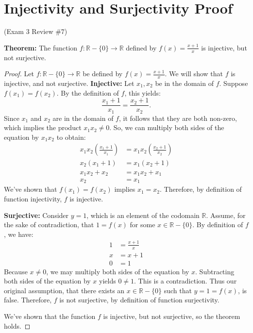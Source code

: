 \documentclass[12pt]{amsart}
\begin{document}
\section{Injectivity and Surjectivity Proof}
\begin{center}(Exam 3 Review $\#7$)\end{center}
\textbf{Theorem:} The function $f: \mathbb{R}-\{0\} \rightarrow \mathbb{R}$ defined by $f(x) = \frac{x+1}{x}$ is injective, but not surjective.
\begin{proof}
Let $f: \mathbb{R} - \{0\} \rightarrow \mathbb{R}$ be defined by $f(x)=\frac{x+1}{x}$. We will show that $f$ is injective, and not surjective.
\medskip
\newline
\textbf{Injective:} 
Let $x_1,x_2$ be in the domain of $f$. Suppose $f(x_1) = f(x_2)$. By the definition of $f$, this yields:
\[
    \frac{x_1+1}{x_1} = \frac{x_2+1}{x_2}.
\]
Since $x_1$ and $x_2$ are in the domain of $f$, it follows that they are both non-zero, which implies the product $x_1x_2 \ne 0$. So, we can multiply both sides of the equation by $x_1x_2$ to obtain:
\begin{align*}
    x_{1}x_{2}\left(\frac{x_1+1}{x_1}\right) &= x_{1}x_{2}\left(\frac{x_2+1}{x_2}\right) \\
    x_2(x_1+1) &= x_1(x_2+1)\\
    x_1x_2+x_2 &= x_1x_2+x_1 \\
    x_2 &= x_1
\end{align*}
We've shown that $f(x_1)=f(x_2)$ implies $x_1=x_2$. Therefore, by definition of function injectivity, $f$ is injective. 

\medskip

\textbf{Surjective:} 
Consider $y = 1$, which is an element of the codomain $\mathbb{R}$. Assume, for the sake of contradiction, that $1=f(x)$ for some $x \in \mathbb{R} - \{0\}$. By definition of $f$, we have:
\begin{align*}
    1 &= \frac{x+1}{x}\\
    x &= x+1 \\
    0 &= 1
\end{align*}
Because $x \neq 0$, we may multiply both sides of the equation by $x$. Subtracting both sides of the equation by $x$ yields $0 \ne 1$. This is a contradiction. Thus our original assumption, that there exists an $x \in \mathbb{R} - \{0\}$ such that $y=1=f(x)$, is false. Therefore, $f$ is not surjective, by definition of function surjectivity.

We've shown that the function $f$ is injective, but not surjective, so the theorem holds.
\end{proof}
\newpage
\end{document}
